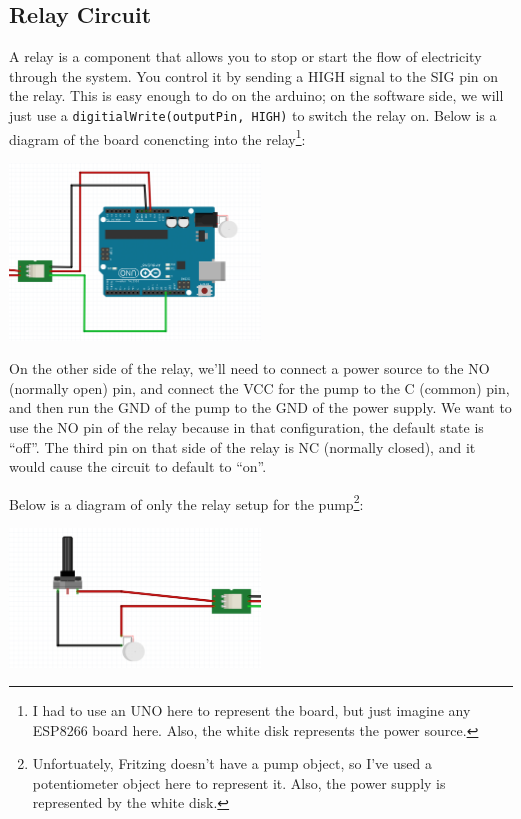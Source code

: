 \subsection{Relay Circuit}
A relay is a component that allows you to stop or start the flow of electricity through the system.
You control it by sending a HIGH signal to the SIG pin on the relay.
This is easy enough to do on the arduino; on the software side, we will just use a \texttt{digitialWrite(outputPin, HIGH)} to switch the relay on.
Below is a diagram of the board conencting into the relay\footnote{I had to use an UNO here to represent the board, but just imagine any ESP8266 board here. Also, the white disk represents the power source.}:
\begin{center}
\includegraphics[width=0.5\textwidth]{controller/controller-circuit.png}
\end{center}

On the other side of the relay, we'll need to connect a power source to the NO (normally open) pin, and connect the VCC for the pump to the C (common) pin, and then run the GND of the pump to the GND of the power supply.
We want to use the NO pin of the relay because in that configuration, the default state is ``off''.
The third pin on that side of the relay is NC (normally closed), and it would cause the circuit to default to ``on''.

Below is a diagram of only the relay setup for the pump\footnote{Unfortuately, Fritzing doesn't have a pump object, so I've used a potentiometer object here to represent it. Also, the power supply is represented by the white disk.}:
\begin{center}
\includegraphics[width=0.5\textwidth]{controller/pump-circuit.png}
\end{center}

